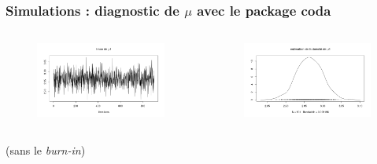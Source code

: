 \begin{frame}
    \frametitle{Simulations : diagnostic de $\mu$ avec le package coda}
    \centering
    \vspace{-0.2cm}
    \begin{columns}
        \begin{column}{0.5\textwidth}
            
            \begin{figure}
                \includegraphics[width=\textwidth]{../MCMC_numeric/simu_gaussian/mu_plot_trac.png} 
            \end{figure}
        \end{column}
        \begin{column}{0.5\textwidth}

            \begin{figure}
                \includegraphics[width=\textwidth]{../MCMC_numeric/simu_gaussian/mu_plot_dens.png} 
            \end{figure}
        \end{column}
    \end{columns}
    (sans le \textit{burn-in})
\end{frame}
